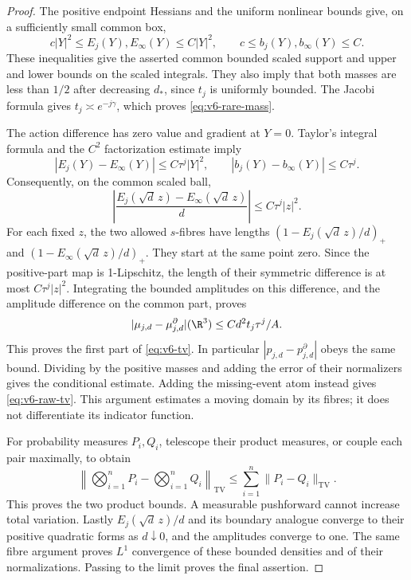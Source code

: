 \begin{proof}
The positive endpoint Hessians and the uniform nonlinear bounds give,
on a sufficiently small common box,
\[
 c|Y|^2\le E_j(Y),E_\infty(Y)\le C|Y|^2,
 \qquad c\le b_j(Y),b_\infty(Y)\le C.
\]
These inequalities give the asserted common bounded scaled support and
upper and lower bounds on the scaled integrals. They also imply that
both masses are less than $1/2$ after decreasing $d_*$, since $t_j$ is
uniformly bounded. The Jacobi formula gives $t_j\asymp e^{-j\gamma}$,
which proves \eqref{eq:v6-rare-mass}.

The action difference has zero value and gradient at $Y=0$.
Taylor's integral formula and the $C^2$ factorization estimate imply
\[
 |E_j(Y)-E_\infty(Y)|\le C\tau^j|Y|^2,
 \qquad |b_j(Y)-b_\infty(Y)|\le C\tau^j.
\]
Consequently, on the common scaled ball,
\[
 \left|\frac{E_j(\sqrt d\,z)-E_\infty(\sqrt d\,z)}d\right|
                   \le C\tau^j|z|^2.
\]
For each fixed $z$, the two allowed $s$-fibres have lengths
$(1-E_j(\sqrt d\,z)/d)_+$ and
$(1-E_\infty(\sqrt d\,z)/d)_+$. They start at the same point zero.
Since the positive-part map is 1-Lipschitz, the length of their symmetric
difference is at most $C\tau^j|z|^2$. Integrating the bounded amplitudes
on this difference, and the amplitude difference on the common part,
proves
\[
 |\mu_{j,d}-\mu^\partial_{j,d}|(\R^3)
                       \le C d^2t_j\tau^j/A.
\]
This proves the first part of \eqref{eq:v6-tv}. In particular
$|p_{j,d}-p^\partial_{j,d}|$ obeys the same bound. Dividing by the
positive masses and adding the error of their normalizers gives the
conditional estimate. Adding the missing-event atom instead gives
\eqref{eq:v6-raw-tv}. This argument estimates a moving domain by its
fibres; it does not differentiate its indicator function.

For probability measures $P_i,Q_i$, telescope their product measures,
or couple each pair maximally, to obtain
\[
 \left\|\bigotimes_{i=1}^nP_i-\bigotimes_{i=1}^nQ_i\right\|_{\mathrm{TV}}
                   \le\sum_{i=1}^n\|P_i-Q_i\|_{\mathrm{TV}}.
\]
This proves the two product bounds. A measurable pushforward cannot
increase total variation. Lastly $E_j(\sqrt d\,z)/d$ and its boundary
analogue converge to their positive quadratic forms as $d\downarrow0$,
and the amplitudes converge to one. The same fibre argument proves
$L^1$ convergence of these bounded densities and of their normalizations.
Passing to the limit proves the final assertion.
\end{proof}

